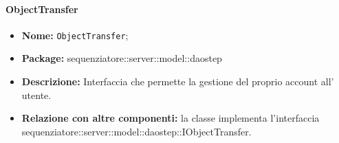 \paragraph{ObjectTransfer}
	\begin{itemize}
		\item \textbf{Nome:} \texttt{ObjectTransfer};
		\item \textbf{Package:} sequenziatore::server::model::daostep
		\item \textbf{Descrizione:} Interfaccia che permette la gestione del proprio account all' utente.
		\item \textbf{Relazione con altre componenti:} la classe implementa l'interfaccia sequenziatore::server::model::daostep::IObjectTransfer.
	\end{itemize}